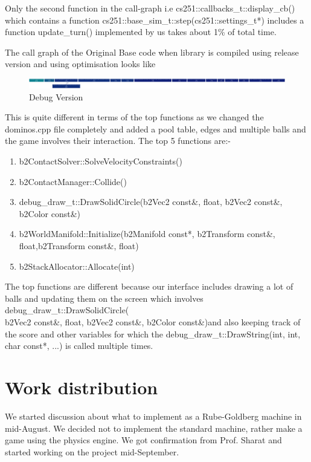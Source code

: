 \documentclass[a4paper,12pt]{article}
\begin{document}
Only the second function in the call-graph i.e  cs251::callbacks\_t::display\_cb() which contains a function 
cs251::base\_sim\_t::step(cs251::settings\_t*) includes a function update\_turn() implemented by us takes about 1\% of total time.


The call graph of the Original Base code when library is compiled using release version and using optimisation looks like 
\begin{figure}[h]
  \centering
  \includegraphics[scale = 0.08]{Report/images/call_graphOriginal.png}
  \caption{Debug Version}
\end{figure}

This is quite different in terms of the top functions as we changed the dominos.cpp file completely and added a pool table, edges and multiple 
balls and the game involves their interaction.
The top 5 functions are:-
\begin{enumerate}
\item b2ContactSolver::SolveVelocityConstraints()
\item b2ContactManager::Collide()
\item debug\_draw\_t::DrawSolidCircle(b2Vec2 const\&, float, b2Vec2 const\&,\\
      b2Color const\&)
\item b2WorldManifold::Initialize(b2Manifold const*,
      b2Transform const\&,\\ float,b2Transform const\&, float)
\item b2StackAllocator::Allocate(int)
\end{enumerate}

The top functions are different because our interface includes drawing a lot of balls and updating them on the screen which involves
debug\_draw\_t::DrawSolidCircle(\\b2Vec2 const\&, float, b2Vec2 const\&, b2Color const\&)and also keeping track of the score and other
variables for which the debug\_draw\_t::DrawString(int, int,
char const*, ...) is called multiple times. 

\clearpage

\section{Work distribution}
We started discussion about what to implement as a Rube-Goldberg machine in mid-August. We decided not to implement the standard machine, rather make a game using the physics engine. We got confirmation from Prof. Sharat and started working on the project mid-September.\\
\end{document}
